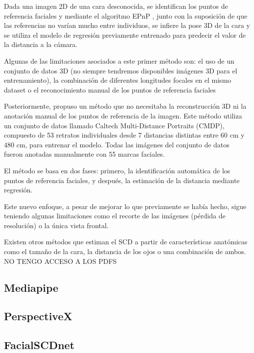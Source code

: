 Dada una imagen 2D de una cara desconocida, se identifican los puntos de referencia faciales y mediante el algoritmo EPnP \cite{29}, junto con la suposición de que las referencias no varían mucho entre individuos, se infiere la pose 3D de la cara y se utiliza el modelo de regresión previamente entrenado para predecir el valor de la distancia a la cámara.

Algunas de las limitaciones asociados a este primer método son: el uso de un conjunto de datos 3D (no siempre tendremos disponibles imágenes 3D para el entrenamiento), la combinación de diferentes longitudes focales en el mismo dataset o el reconocimiento manual de los puntos de referencia faciales

Posteriormente, \cite{30} propuso un método que no necesitaba la reconstrucción 3D ni la anotación manual de los puntos de referencia de la imagen. Este método utiliza un conjunto de datos llamado Caltech Multi-Distance Portraits (CMDP), compuesto de 53 retratos individuales desde 7 distancias distintas entre 60 cm y 480 cm, para entrenar el modelo. Todas las imágenes del conjunto de datos fueron anotadas manualmente con 55 marcas faciales. 

El método se basa en dos fases: primero, la identificación automática de los puntos de referencia faciales, y después, la estimación de la distancia mediante regresión.

Este nuevo enfoque, a pesar de mejorar lo que previamente se había hecho, sigue teniendo algunas limitaciones como el recorte de las imágenes (pérdida de resolución) o la única vista frontal.

Existen otros métodos que estiman el SCD a partir de características anatómicas como el tamaño de la cara, la distancia de los ojos o una combinación de ambos. NO TENGO ACCESO A LOS PDFS

\subsection{Mediapipe}


\subsection{PerspectiveX}

\subsection{FacialSCDnet}
































